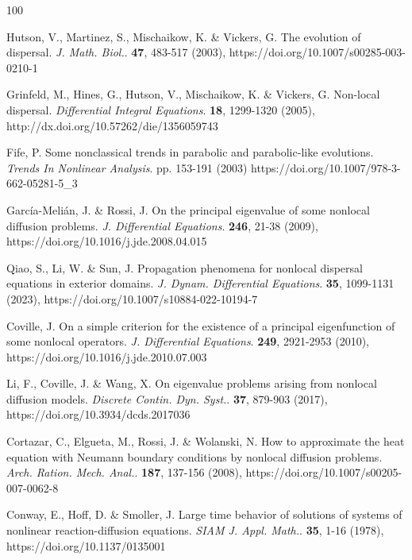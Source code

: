 \documentclass[12pt, a4paper]{article}
\theoremstyle{break}
\theoremstyle{break}
\theoremstyle{break}
\theoremstyle{break}
\theoremstyle{break}
\begin{document}
\begin{thebibliography}{100}
    
     Hutson, V., Martinez, S., Mischaikow, K. \& Vickers, G. The evolution of dispersal. {\em J. Math. Biol.}. \textbf{47}, 483-517 (2003), https://doi.org/10.1007/s00285-003-0210-1
    
     Grinfeld, M., Hines, G., Hutson, V., Mischaikow, K. \& Vickers, G. Non-local dispersal. {\em Differential Integral Equations}. \textbf{18}, 1299-1320 (2005), http://dx.doi.org/10.57262/die/1356059743
    
    Fife, P. Some nonclassical trends in parabolic and parabolic-like evolutions. {\em Trends In Nonlinear Analysis}. pp. 153-191 (2003) https://doi.org/10.1007/978-3-662-05281-5\_3
    
    Garc\'{i}a-Meli\'{a}n, J. \& Rossi, J. On the principal eigenvalue of some nonlocal diffusion problems. {\em J. Differential Equations}. \textbf{246}, 21-38 (2009), https://doi.org/10.1016/j.jde.2008.04.015
    
    Qiao, S., Li, W. \& Sun, J. Propagation phenomena for nonlocal dispersal equations in exterior domains. {\em J. Dynam. Differential Equations}. \textbf{35}, 1099-1131 (2023), https://doi.org/10.1007/s10884-022-10194-7
    
    Coville, J. On a simple criterion for the existence of a principal eigenfunction of some nonlocal operators. {\em J. Differential Equations}. \textbf{249}, 2921-2953 (2010), https://doi.org/10.1016/j.jde.2010.07.003
    
    Li, F., Coville, J. \& Wang, X. On eigenvalue problems arising from nonlocal diffusion models. {\em Discrete Contin. Dyn. Syst.}. \textbf{37}, 879-903 (2017), https://doi.org/10.3934/dcds.2017036
    
    Cortazar, C., Elgueta, M., Rossi, J. \& Wolanski, N. How to approximate the heat equation with Neumann boundary conditions by nonlocal diffusion problems. {\em Arch. Ration. Mech. Anal.}. \textbf{187}, 137-156 (2008), https://doi.org/10.1007/s00205-007-0062-8
    
    Conway, E., Hoff, D. \& Smoller, J. Large time behavior of solutions of systems of nonlinear reaction-diffusion equations. {\em SIAM J. Appl. Math.}. \textbf{35}, 1-16 (1978), https://doi.org/10.1137/0135001
    

\end{thebibliography}
\end{document}
